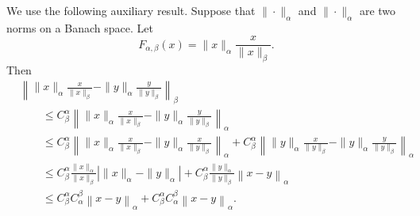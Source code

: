 \documentclass[a4paper]{article}
\begin{document}
    We use the following auxiliary result. 
    Suppose that $\|\cdot\|_{\alpha}$ and $\|\cdot\|_{\alpha}$ are two norms on a Banach space.
    Let 
    $$
        F_{\alpha,\beta}(x) = \| x \|_{\alpha} \frac{ x }{ \| x \|_{\beta} }.
    $$
    Then 
    \begin{align*}
        &
        \left\| 
            \| x \|_{\alpha} \frac{ x }{ \| x \|_{\beta} } 
            - 
            \| y \|_{\alpha} \frac{ y }{ \| y \|_{\beta} } 
        \right\|_{\beta}
        \\&\qquad 
        \leq 
        C_{\beta}^{\alpha} 
        \left\| 
            \| x \|_{\alpha} \frac{ x }{ \| x \|_{\beta} } 
            - 
            \| y \|_{\alpha} \frac{ y }{ \| y \|_{\beta} } 
        \right\|_{\alpha}
        \\&\qquad 
        \leq 
        C_{\beta}^{\alpha} 
        \left\| 
            \| x \|_{\alpha} \frac{ x }{ \| x \|_{\beta} } 
            - 
            \| y \|_{\alpha} \frac{ x }{ \| y \|_{\beta} } 
        \right\|_{\alpha}
        +
        C_{\beta}^{\alpha} 
        \left\| 
            \| y \|_{\alpha} \frac{ x }{ \| y \|_{\beta} } 
            - 
            \| y \|_{\alpha} \frac{ y }{ \| y \|_{\beta} } 
        \right\|_{\alpha}
        \\&\qquad 
        \leq 
        C_{\beta}^{\alpha} 
        \frac{ \| x \|_{\alpha} }{ \| x \|_{\beta} } 
        \left| 
            \| x \|_{\alpha}
            - 
            \| y \|_{\alpha}
        \right|
        +
        C_{\beta}^{\alpha} 
        \frac{ \| y \|_{\alpha} }{ \| y \|_{\beta} } 
        \left\| x - y \right\|_{\alpha}
        \\&\qquad 
        \leq 
        C_{\beta}^{\alpha} 
        C_{\alpha}^{\beta} 
        \left\| x - y \right\|_{\alpha}
        +
        C_{\beta}^{\alpha} 
        C_{\alpha}^{\beta} 
        \left\| x - y \right\|_{\alpha}
        .
    \end{align*}
\end{document}
